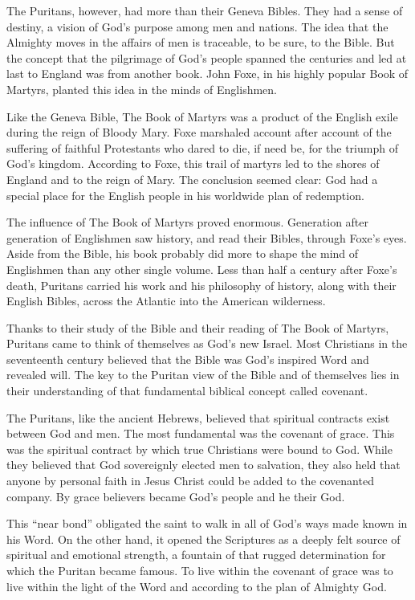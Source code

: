 The Puritans, however, had more than their Geneva Bibles. They had a sense of destiny, a vision of
God’s purpose among men and nations. The idea that the Almighty moves in the affairs of men is
traceable, to be sure, to the Bible. But the concept that the pilgrimage of God’s people spanned the
centuries and led at last to England was from another book. John Foxe, in his highly popular Book of
Martyrs, planted this idea in the minds of Englishmen.

Like the Geneva Bible, The Book of Martyrs was a product of the English exile during the reign of
Bloody Mary. Foxe marshaled account after account of the suffering of faithful Protestants who dared
to die, if need be, for the triumph of God’s kingdom. According to Foxe, this trail of martyrs led
to the shores of England and to the reign of Mary. The conclusion seemed clear: God had a special
place for the English people in his worldwide plan of redemption.

The influence of The Book of Martyrs proved enormous. Generation after generation of Englishmen saw
history, and read their Bibles, through Foxe’s eyes. Aside from the Bible, his book probably did
more to shape the mind of Englishmen than any other single volume. Less than half a century after
Foxe’s death, Puritans carried his work and his philosophy of history, along with their English
Bibles, across the Atlantic into the American wilderness.

Thanks to their study of the Bible and their reading of The Book of Martyrs, Puritans came to think
of themselves as God’s new Israel. Most Christians in the seventeenth century believed that the
Bible was God’s inspired Word and revealed will. The key to the Puritan view of the Bible and of
themselves lies in their understanding of that fundamental biblical concept called covenant.

The Puritans, like the ancient Hebrews, believed that spiritual contracts exist between God and men.
The most fundamental was the covenant of grace. This was the spiritual contract by which true
Christians were bound to God. While they believed that God sovereignly elected men to salvation,
they also held that anyone by personal faith in Jesus Christ could be added to the covenanted
company. By grace believers became God’s people and he their God.

This “near bond” obligated the saint to walk in all of God’s ways made known in his Word. On the
other hand, it opened the Scriptures as a deeply felt source of spiritual and emotional strength, a
fountain of that rugged determination for which the Puritan became famous. To live within the
covenant of grace was to live within the light of the Word and according to the plan of Almighty
God.


